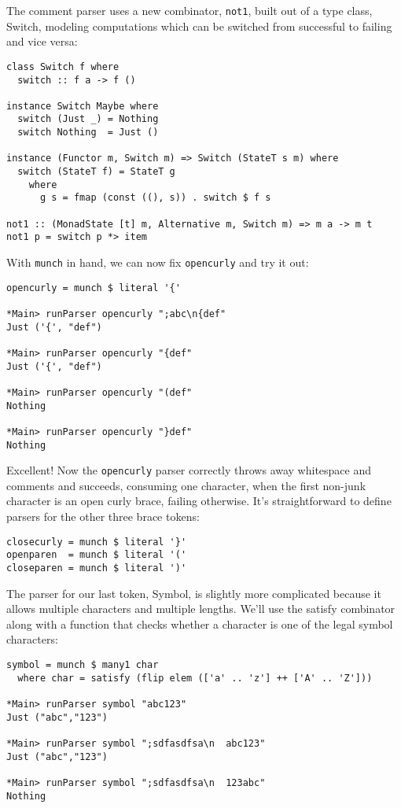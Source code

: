 \documentclass{tmr}
\begin{document}
The comment parser uses a new combinator, \verb+not1+, built out of a 
type class, Switch, modeling computations which can be switched from
successful to failing and vice versa:
\begin{verbatim}
class Switch f where
  switch :: f a -> f ()

instance Switch Maybe where
  switch (Just _) = Nothing
  switch Nothing  = Just ()

instance (Functor m, Switch m) => Switch (StateT s m) where
  switch (StateT f) = StateT g
    where 
      g s = fmap (const ((), s)) . switch $ f s

not1 :: (MonadState [t] m, Alternative m, Switch m) => m a -> m t
not1 p = switch p *> item
\end{verbatim}

With \verb+munch+ in hand, we can now fix \verb+opencurly+ and try it out:
\begin{verbatim}
opencurly = munch $ literal '{'

*Main> runParser opencurly ";abc\n{def"
Just ('{', "def")

*Main> runParser opencurly "{def"
Just ('{', "def")

*Main> runParser opencurly "(def"
Nothing

*Main> runParser opencurly "}def"
Nothing
\end{verbatim}

Excellent!  Now the \verb+opencurly+ parser correctly throws away whitespace 
and comments and succeeds, consuming one character, when the first non-junk 
character is an open curly brace, failing otherwise.
It's straightforward to define parsers for the other three brace tokens:
\begin{verbatim}
closecurly = munch $ literal '}'
openparen  = munch $ literal '('
closeparen = munch $ literal ')'
\end{verbatim}

The parser for our last token, Symbol, is slightly more complicated because it allows
multiple characters and multiple lengths.  We'll use the satisfy combinator along with 
a function that checks whether a character is one of the legal symbol characters:
\begin{verbatim}
symbol = munch $ many1 char
  where char = satisfy (flip elem (['a' .. 'z'] ++ ['A' .. 'Z']))

*Main> runParser symbol "abc123"
Just ("abc","123")

*Main> runParser symbol ";sdfasdfsa\n  abc123"
Just ("abc","123")

*Main> runParser symbol ";sdfasdfsa\n  123abc"
Nothing
\end{verbatim}
\end{document}
